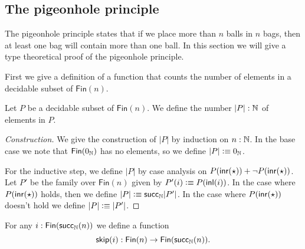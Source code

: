 \subsection{The pigeonhole principle}

The pigeonhole principle states that if we place more than $n$ balls in $n$ bags, then at least one bag will contain more than one ball. In this section we will give a type theoretical proof of the pigeonhole principle.

First we give a definition of a function that counts the number of elements in a decidable subset of $\mathsf{Fin}(n)$.

\begin{defn}
  Let $P$ be a decidable subset of $\mathsf{Fin}(n)$. We define the number $|P|:{\mathbb{N}}$ of elements in $P$.
\end{defn}

\begin{proof}[Construction]
  We give the construction of $|P|$ by induction on $n:{\mathbb{N}}$. In the base case we note that $\mathsf{Fin}(0_{{\mathbb{N}}})$ has no elements, so we define $|P|\vcentcolon\equiv0_{{\mathbb{N}}}$.

  For the inductive step, we define $|P|$ by case analysis on $P({\mathsf{inr}}(\star))+\neg P({\mathsf{inr}}(\star))$. Let $P'$ be the family over $\mathsf{Fin}(n)$ given by $P'(i)\vcentcolon\equiv P({\mathsf{inl}}(i))$. In the case where $P({\mathsf{inr}}(\star))$ holds, then we define $|P|\vcentcolon\equiv \mathsf{succ}_{{\mathbb{N}}} |P'|$. In the case where $P({\mathsf{inr}}(\star))$ doesn't hold we define $|P|\vcentcolon\equiv |P'|$.
\end{proof}

\begin{defn}
  For any $i:\mathsf{Fin}(\mathsf{succ}_{{\mathbb{N}}}(n))$ we define a function
  \begin{equation*}
    \mathsf{skip}(i):\mathsf{Fin}(n)\to\mathsf{Fin}(\mathsf{succ}_{{\mathbb{N}}}(n)).
  \end{equation*}
\end{defn}

